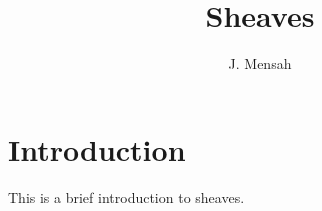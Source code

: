 \documentclass[11pt]{article}
\title{Sheaves}
\author{J. Mensah}
\begin{document}
\maketitle
\tableofcontents

\section{Introduction}
This is a brief introduction to sheaves.
\end{document}
